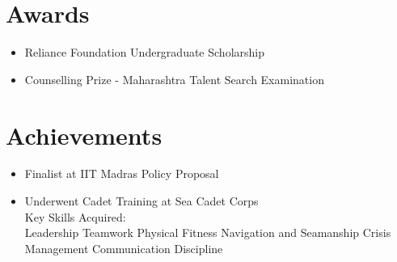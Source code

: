 \documentclass[]{resume}
\begin{document}
\begin{minipage}[t]{0.33\textwidth}

\section{Awards}
{\small \begin{itemize}
    \item Reliance Foundation Undergraduate Scholarship
    \item Counselling Prize - Maharashtra Talent Search Examination
\end{itemize}}
\sectionsep


\section{Achievements}
    {\small 
\begin{itemize}
    \item Finalist at IIT Madras Policy Proposal \href{https://github.com/User-DK/Resume/blob/main/assets/Policy%20proposaliitm(daivikandpratima)final.pdf}{\faLink}
    \item Underwent Cadet Training at Sea Cadet Corps \href{https://github.com/User-DK/Resume/blob/main/assets/cadet.pdf}{\faLink} \\

    Key Skills Acquired: \\
    Leadership \textbullet{} Teamwork \textbullet{} Physical Fitness \textbullet{} Navigation and Seamanship \textbullet{} Crisis Management \textbullet{} Communication \textbullet{} Discipline
\end{itemize}
    }
\sectionsep


\end{minipage}
\end{document}
